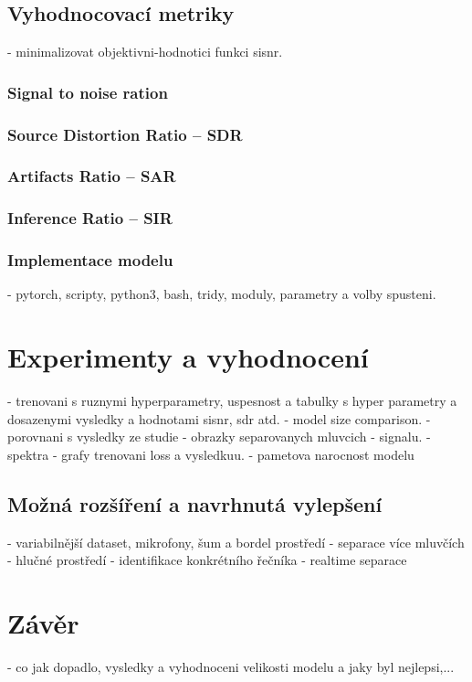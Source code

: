\section{Vyhodnocovací metriky}
- minimalizovat objektivni-hodnotici funkci sisnr.
\subsection{Signal to noise ration}
\subsection*{Source Distortion Ratio -- SDR}
\subsection*{Artifacts Ratio -- SAR}
\subsection*{Inference Ratio -- SIR}

\subsection{Implementace modelu}
- pytorch, scripty, python3, bash, tridy, moduly, parametry a volby spusteni.



\chapter{Experimenty a vyhodnocení}
\label{experimenty}
- trenovani s ruznymi hyperparametry, uspesnost a tabulky s hyper parametry a dosazenymi vysledky a hodnotami sisnr, sdr atd.
- model size comparison.
- porovnani s vysledky ze studie
- obrazky separovanych mluvcich - signalu.
- spektra
- grafy trenovani loss a vysledkuu.
- pametova narocnost modelu


\section{Možná rozšíření a navrhnutá vylepšení}
- variabilnější dataset, mikrofony, šum a bordel prostředí
- separace více mluvčích
- hlučné prostředí
- identifikace konkrétního řečníka
- realtime separace


\chapter{Závěr}
\label{zaver}
- co jak dopadlo, vysledky a vyhodnoceni velikosti modelu a jaky byl nejlepsi,...
\blindtext[3]

